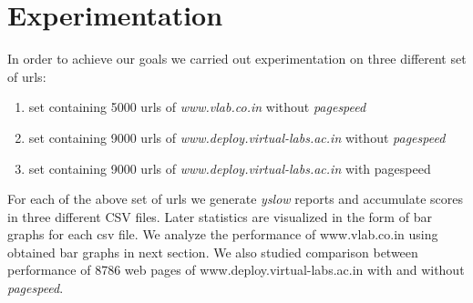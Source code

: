 \documentclass[conference]{IEEEtran}
\begin{document}
\section{Experimentation}\label{sec-5}
In order to achieve our goals we carried out experimentation on three different set of urls:
\begin{enumerate}
 \item set containing 5000 urls of {\it www.vlab.co.in} without {\it pagespeed}
 \item set containing 9000 urls of {\it www.deploy.virtual-labs.ac.in} without {\it pagespeed}
 \item set containing 9000 urls of {\it www.deploy.virtual-labs.ac.in} with pagespeed
\end{enumerate}
For each of the above set of urls we generate {\it yslow} reports and accumulate scores
in three different CSV files. Later statistics are visualized in the form of bar graphs for each csv file.
We analyze the performance of www.vlab.co.in using obtained bar graphs in next section.
We also studied comparison between performance of 8786 web pages of www.deploy.virtual-labs.ac.in
with and without {\it pagespeed}.

% 
% 
\end{document}
